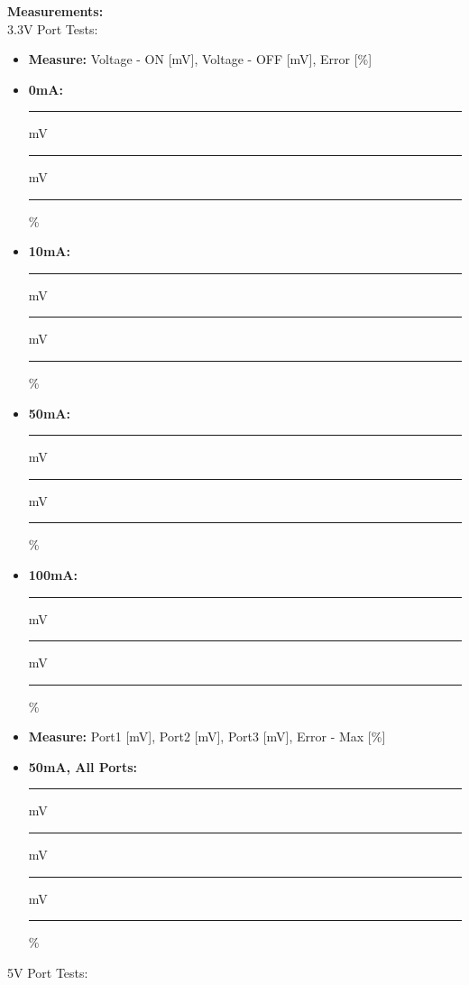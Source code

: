 {\Large \textbf{Measurements:}}\\
{\Large 3.3V Port Tests:}
\begin{itemize}
\item \textbf{Measure:} Voltage - ON [mV], Voltage - OFF [mV], Error [\%]
\item \textbf{0mA:} \rule{2cm}{0.15mm} mV \hspace{0.5cm} \rule{2cm}{0.15mm} mV \hspace{0.5cm} \rule{2cm}{0.15mm} \%
\item \textbf{10mA:} \rule{2cm}{0.15mm} mV \hspace{0.5cm} \rule{2cm}{0.15mm} mV \hspace{0.5cm} \rule{2cm}{0.15mm} \%
\item \textbf{50mA:} \rule{2cm}{0.15mm} mV \hspace{0.5cm} \rule{2cm}{0.15mm} mV \hspace{0.5cm} \rule{2cm}{0.15mm} \%
\item \textbf{100mA:} \rule{2cm}{0.15mm} mV \hspace{0.5cm} \rule{2cm}{0.15mm} mV \hspace{0.5cm} \rule{2cm}{0.15mm} \%
\item \textbf{Measure:} Port1 [mV], Port2 [mV], Port3 [mV], Error - Max [\%]
\item \textbf{50mA, All Ports:} \rule{2cm}{0.15mm} mV \hspace{0.5cm} \rule{2cm}{0.15mm} mV \hspace{0.5cm} \rule{2cm}{0.15mm} mV \hspace{0.5cm} \rule{2cm}{0.15mm} \%
\end{itemize}
\newpage
{\Large 5V Port Tests:}
